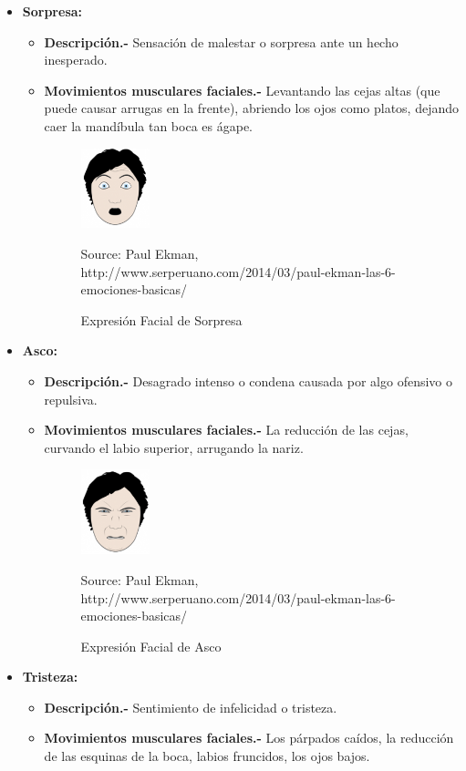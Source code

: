 \begin{itemize}
\item {\textbf{Sorpresa:} 
\begin{itemize}
\item \textbf{Descripción.-} Sensación de malestar o sorpresa ante un hecho inesperado.
\item { \textbf{Movimientos musculares faciales.-} Levantando las cejas altas (que puede causar
arrugas en la frente), abriendo los ojos como platos, dejando caer la mandíbula
tan boca es ágape.

\begin{figure}[H]
		\centering
		\includegraphics[width=20mm]{./Imagenes/sorpresa.png}
		\caption{Expresión Facial de Sorpresa}
		Source: Paul Ekman, http://www.serperuano.com/2014/03/paul-ekman-las-6-emociones-basicas/
		\label{fig:sorpresa}
\end{figure}}
\end{itemize}}


\item {\textbf{Asco:} 
\begin{itemize}
\item \textbf{Descripción.-} Desagrado intenso o condena causada por algo ofensivo o
repulsiva.
\item { \textbf{Movimientos musculares faciales.-} La reducción de las cejas, curvando el labio
superior, arrugando la nariz.

\begin{figure}[H]
		\centering
		\includegraphics[width=20mm]{./Imagenes/asco.png}
		\caption{Expresión Facial de Asco}
		Source: Paul Ekman, http://www.serperuano.com/2014/03/paul-ekman-las-6-emociones-basicas/
		\label{fig:asco}
\end{figure}}
\end{itemize}}



\item {\textbf{Tristeza:} 
\begin{itemize}
\item \textbf{Descripción.-} Sentimiento de infelicidad o tristeza.
\item { \textbf{Movimientos musculares faciales.-} Los párpados caídos, la reducción de las
esquinas de la boca, labios fruncidos, los ojos bajos.

}
\end{itemize}}
\end{itemize}
